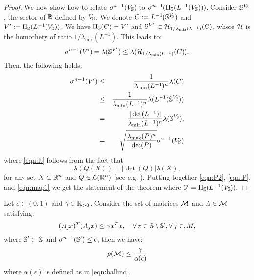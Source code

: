 \begin{proof}

We now show how to relate $\sigma^{n-1}(V_{\mathbb{S}})$ to $\sigma^{n-1}(\Pi_{\mathbb{S}}(L^{-1}(V_{\mathbb{S}})))$. Consider $\mathbb{S}^{V_{\mathbb{S}}}$, the sector of $\mathbb{B}$ defined by $V_{\mathbb{S}}$. We denote $C:= L^{-1}(\mathbb{S}^{V_{\mathbb{S}}})$ and $V':=\Pi_{\mathbb{S}}(L^{-1}(V_{\mathbb{S}}))$. We have $\Pi_{\mathbb{S}}(C) = V'$ and $\mathbb{S}^{V'} \subset \mathcal{H}_{1/ \lambda_{\min}(L^{-1})}(C),$
where $\mathcal{H}$ is the homothety of ratio $1/ \lambda_{\min}(L^{-1})$. This leads to:
$$\sigma^{n-1}(V') = \lambda(\mathbb{S}^{V'}) \leq \lambda (\mathcal{H}_{1/ \lambda_{\min}(L^{-1})}(C)).$$ Then, the following holds: \begin{eqnarray}\nonumber\sigma^{n-1}(V') &\leq& \frac{1}{\lambda_{\min}(L^{-1})^n}\lambda(C) \\
\nonumber &\leq&\frac{1}{\lambda_{\min}(L^{-1})^n} \lambda( L^{-1}(\mathbb{S}^{V_{\mathbb{S}}}))\\ 
\label{eqn:lt} &=&\frac{|\det(L^{-1})|}{\lambda_{\min}(L^{-1})^n}\lambda(\mathbb{S}^{V_{\mathbb{S}}}),\\
 \label{eqn:map1} &=&\sqrt{\frac{\lambda_{\max}(P)^n}{\det(P)}}\sigma^{n-1}(V_{\mathbb{S}})
\end{eqnarray}
where \eqref{eqn:lt} follows from the fact that
$$ \lambda(Q(X)) = |\det(Q)| \lambda(X),$$
for any set $X \subset \mathbb{R}^n$ and $Q \in \mathcal{L}(\mathbb{R}^n)$ (see e.g. \cite{rudin}).
Putting together \eqref{eqn:P2}, \eqref{eqn:P}, and \eqref{eqn:map1} we get the statement of the theorem where $\mathbb{S}' = \Pi_{\mathbb{S}}(L^{-1}(V_{\mathbb{S}})).$
\end{proof}

\begin{lemma}\label{lemma:epsilon1}Let $\epsilon \in (0, 1)$ and $\gamma \in \mathbb{R}_{> 0}$. Consider the set of matrices $\mathcal{M}$ and $A \in \mathcal{M}$ satisfying:
\begin{equation}\label{eqn:contraction}(A_jx)^T(A_jx) \leq \gamma x^Tx, \quad \forall\, x \in \mathbb{S} \setminus \mathbb{S}', \forall\,j \in, M,\end{equation}
where $\mathbb{S}' \subset \mathbb{S}$ and $\sigma^{n-1}(\mathbb{S}') \leq \epsilon$, then we have:
\begin{equation*}
\rho(\mathcal{M}) \leq \frac{\gamma}{\alpha(\epsilon)}
\end{equation*}
where $\alpha(\epsilon)$ is defined as in \eqref{eqn:ballinc}.
\end{lemma}


